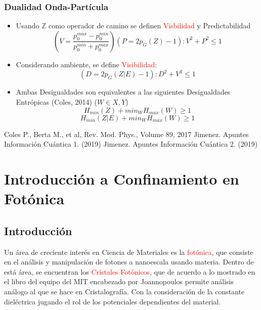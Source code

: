\documentclass{book}
\begin{document}
\subsection{Dualidad Onda-Partícula}
\begin{itemize}
    \item Usando $\mathbb{Z}$ como operador de camino se definen \textcolor{red}{Visbilidad} y {Predictabilidad}
    \begin{equation} \label{eq26} (V=\frac{p_0^{max}-p_0^{min}}{p_0^{min}+p_0^{max}}) (P=2p_G(Z)-1) : V^2+P^2\leq 1\end{equation} 
    \item Considerando ambiente, se define \textcolor{red}{Visibilidad}:
    \begin{equation} \label{eq27} (D=2p_G(Z|E)-1): D^2+V^2\leq 1 \end{equation} 
    \item Ambas Desigualdades son equivalentes a las siguientes Desigualdades Entrópicas (Coles, 2014) ($W\in X, Y$) 
    \begin{equation} \label{eq28}H_{min}(Z)+min_W H_{max}(W)\geq 1 \end{equation} 
    \begin{equation} \label{eq29}H_{min}(Z|E)+min_W H_{max}(W)\geq 1\end{equation} 
\end{itemize}
\begin{thebibliography}{9}
 Coles P., Berta M., et al, Rev. Mod. Phys., Volume 89, 2017
 Jimenez. Apuntes Información Cuántica 1. (2019)
 Jimenez. Apuntes Información Cuántica 2. (2019)
\end{thebibliography}
\chapter{Introducción a Confinamiento en Fotónica}
\section{Introducción}
Un área de creciente interés en Ciencia de Materiales es la \textcolor{red}{fotónica}, que consiste en el análisis y manipulación de fotones a nanoescala usando materia. Dentro de está área, se encuentran los \textcolor{red}{Cristales Fotónicos}, que de acuerdo a lo mostrado en el libro del equipo del MIT encabezado por Joannopoulos \textcolor{red}{\cite{abinitio}} permite análisis análogo al que se hace en Cristalografía. Con la consideración de la constante dieléctrica jugando el rol de los potenciales dependientes del material.
\end{document}
